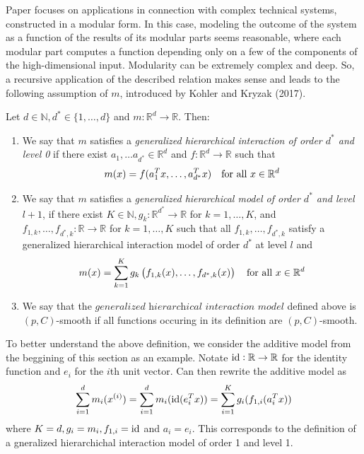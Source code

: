 Paper focuses on applications in connection with complex technical systems, constructed in a modular form. In this case, modeling the outcome of the system as a function of the results of its modular parts seems reasonable, where each modular part computes a function depending only on a few of the components of the high-dimensional input. Modularity can be extremely complex and deep. So, a recursive application of the described relation makes sense and leads to the following assumption of $m$, introduced by Kohler and Kryzak (2017). 

\begin{definition}
	\label{def:DLNPR-2}
	Let $d\in\mathbb{N}, d^* \in \{1, \dots, d\}$ and $m:\mathbb{R}^d \rightarrow \mathbb{R}$. Then:
	\begin{enumerate}
		\item We say that $m$ satisfies a \textit{generalized hierarchical interaction of order $d^*$ and level 0} if there exist $a_1,\dots a_{d^*} \in \mathbb{R}^d$ and $f:    \mathbb{R}^d \rightarrow \mathbb{R}$ such that 
		\[m(x) = f(a_1^T x, \dots, a_{d^*}^T x)\hbox{ }\hbox{ }\text{ for all $x \in \mathbb{R}^d$}\]
		\item We say that $m$ satisfies a \textit{generalized hierarchical model of order $d^*$ and level $l+1$}, if there exist $K \in \mathbb{N}, g_k:\mathbb{R}^{d^*} \rightarrow \mathbb{R}$ for $k = 1, \dots, K$, and $f_{1,k}, \dots, f_{d^*,k}: \mathbb{R}\rightarrow \mathbb{R}$ for $k = 1,\dots, K$ such that all $f_{1,k},\dots,f_{d^*,k}$ satisfy a generalized hierarchical interaction model of order $d^*$ at level $l$ and 
		\[m(x) = \sum_{k=1}^K g_k\left(f_{1,k}(x),\dots,f_{d^*,k}(x)\right)\hbox{ }\hbox{ }\text{ for all $x \in \mathbb{R}^d$}\]
		\item We say that the $\textit{generalized hierarchical interaction model}$ defined above is $(p,C)$-smooth if all functions occuring in its definition are $(p,C)$-smooth.
	\end{enumerate}
\end{definition}

To better understand the above definition, we consider the additive model from the beggining of this section as an example. Notate $\operatorname*{id}:\mathbb{R}\rightarrow\mathbb{R}$ for the identity function and $e_i$ for the $i$th unit vector. Can then rewrite the additive model as 
\[\sum_{i=1}^d m_i(x^{(i)}) = \sum_{i=1}^d m_i(\operatorname*{id}(e_i^Tx)) = \sum_{i=1}^K g_i(f_{1,i}(a_i^Tx))\]
where $K = d, g_i = m_i, f_{1,i} = \operatorname*{id}$ and $a_i = e_i$. This corresponds to the definition of a gneralized hierarchichal interaction model of order 1 and level 1. 

